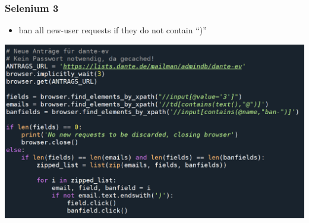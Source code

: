 \documentclass[12pt,ngerman]{beamer}
\begin{document}
\begin{frame}
\frametitle{Selenium 3}

\begin{itemize}
	\item ban all new-user requests if they do not contain \enquote{)}
\end{itemize}\vspace*{-1em}


\begin{center}
\hspace*{-1em}\includegraphics[width=1.1\textwidth]{sel3}
\end{center}

\end{frame}
\end{document}
